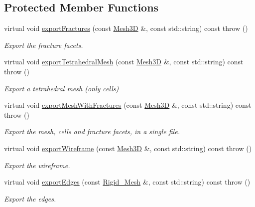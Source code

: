 \subsection*{Protected Member Functions}
\begin{DoxyCompactItemize}
\item 
virtual void \hyperlink{classFVCode3D_1_1ExporterCP_a7d325ef094642f2b46663ef40e038f17}{export\+Fractures} (const \hyperlink{classFVCode3D_1_1Mesh3D}{Mesh3D} \&, const std\+::string) const   throw ()
\begin{DoxyCompactList}\small\item\em Export the fracture facets. \end{DoxyCompactList}\item 
virtual void \hyperlink{classFVCode3D_1_1ExporterCP_a4894361d7a2669788c1d0f5a945d2303}{export\+Tetrahedral\+Mesh} (const \hyperlink{classFVCode3D_1_1Mesh3D}{Mesh3D} \&, const std\+::string) const   throw ()
\begin{DoxyCompactList}\small\item\em Export a tetrahedral mesh (only cells) \end{DoxyCompactList}\item 
virtual void \hyperlink{classFVCode3D_1_1ExporterCP_a6de81c857aa6d8ebddd0b7130ba57450}{export\+Mesh\+With\+Fractures} (const \hyperlink{classFVCode3D_1_1Mesh3D}{Mesh3D} \&, const std\+::string) const   throw ()
\begin{DoxyCompactList}\small\item\em Export the mesh, cells and fracture facets, in a single file. \end{DoxyCompactList}\item 
virtual void \hyperlink{classFVCode3D_1_1ExporterCP_a217c7083482f5048ecf00ea7d98790d8}{export\+Wireframe} (const \hyperlink{classFVCode3D_1_1Mesh3D}{Mesh3D} \&, const std\+::string) const   throw ()
\begin{DoxyCompactList}\small\item\em Export the wireframe. \end{DoxyCompactList}\item 
virtual void \hyperlink{classFVCode3D_1_1ExporterCP_a3faa6afaa47f395ab8e440ebd3a25ab6}{export\+Edges} (const \hyperlink{classFVCode3D_1_1Rigid__Mesh}{Rigid\+\_\+\+Mesh} \&, const std\+::string) const   throw ()
\begin{DoxyCompactList}\small\item\em Export the edges. \end{DoxyCompactList}\item 

\end{DoxyCompactItemize}
